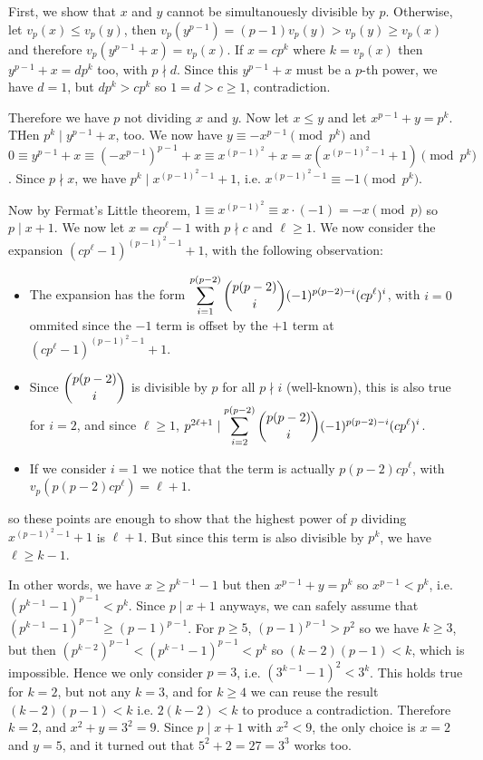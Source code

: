 \documentclass[11pt,a4paper]{article}
\begin{document}
\begin{enumerate}
	First, we show that $x$ and $y$ cannot be simultanouesly divisible by $p$. Otherwise, let $v_p(x)\le v_p(y)$, then $v_p(y^{p-1})=(p-1)v_p(y)>v_p(y)\ge v_p(x)$ and therefore $v_p(y^{p-1}+x)=v_p(x)$. If $x=cp^k$ where $k=v_p(x)$ then $y^{p-1}+x=dp^k$ too, with $p\nmid d$. Since this $y^{p-1}+x$ must be a $p$-th power, we have $d=1$, but $dp^k>cp^k$ so $1=d>c\ge 1$, contradiction. 
	
	Therefore we have $p$ not dividing $x$ and $y$. Now let $x\le y$ and let $x^{p-1}+y=p^k$. THen $p^k\mid y^{p-1}+x$, too. We now have $y\equiv -x^{p-1}\pmod{p^k}$ and $0\equiv y^{p-1}+x\equiv (-x^{p-1})^{p-1}+x\equiv x^{(p-1)^2}+x=x(x^{(p-1)^2-1}+1)\pmod{p^k}$. 
	Since $p\nmid x$, we have $p^k\mid x^{(p-1)^2-1}+1$, i.e. $x^{(p-1)^2-1}\equiv -1\pmod{p^k}$. 
	
	Now by Fermat's Little theorem, $1\equiv x^{(p-1)^2}\equiv x\cdot(-1)=-x\pmod{p}$ so $p\mid x+1$. We now let $x=cp^{\ell}-1$ with $p\nmid c$ and $\ell\ge 1$. We now consider the expansion $(cp^{\ell}-1)^{(p-1)^2-1}+1$, with the following observation: 
	\begin{itemize}
		\item The expansion has the form $\displaystyle\sum_{i=1}^{p(p-2)}\dbinom{p(p-2)}{i}(-1)^{p(p-2)-i}(cp^{\ell})^i$, with $i=0$ ommited since the $-1$ term is offset by the $+1$ term at $(cp^{\ell}-1)^{(p-1)^2-1}+1$. 
		
		\item Since $\dbinom{p(p-2)}{i}$ is divisible by $p$ for all $p\nmid i$ (well-known), this is also true for $i=2$, and since $\ell\ge 1$, $p^{2\ell+1}\mid \displaystyle\sum_{i=2}^{p(p-2)}\dbinom{p(p-2)}{i}(-1)^{p(p-2)-i}(cp^{\ell})^i$. 
		
		\item If we consider $i=1$ we notice that the term is actually $p(p-2)cp^{\ell}$, with $v_p(p(p-2)cp^{\ell})=\ell+1$. 
	\end{itemize}
	so these points are enough to show that the highest power of $p$ dividing $x^{(p-1)^2-1}+1$ is $\ell+1$. But since this term is also divisible by $p^k$, we have $\ell\ge k-1$. 
	
	In other words, we have $x\ge p^{k-1}-1$ but then $x^{p-1}+y=p^k$ so $x^{p-1}<p^k$, i.e. $(p^{k-1}-1)^{p-1}<p^k$. Since $p\mid x+1$ anyways, we can safely assume that $(p^{k-1}-1)^{p-1}\ge (p-1)^{p-1}$. For $p\ge 5$, $(p-1)^{p-1}>p^2$ so we have $k\ge 3$, but then $(p^{k-2})^{p-1} < (p^{k-1}-1)^{p-1}<p^k$ so $(k-2)(p-1)<k$, which is impossible. Hence we only consider $p=3$, i.e. $(3^{k-1}-1)^2<3^k$. This holds true for $k=2$, but not any $k=3$, and for $k\ge 4$ we can reuse the result $(k-2)(p-1)<k$ i.e. $2(k-2)<k$ to produce a contradiction. 
	Therefore $k=2$, and $x^2+y=3^2=9$. Since $p\mid x+1$ with $x^2<9$, the only choice is $x=2$ and $y=5$, and it turned out that $5^2+2=27=3^3$ works too. 
	

\end{enumerate}
\end{document}
